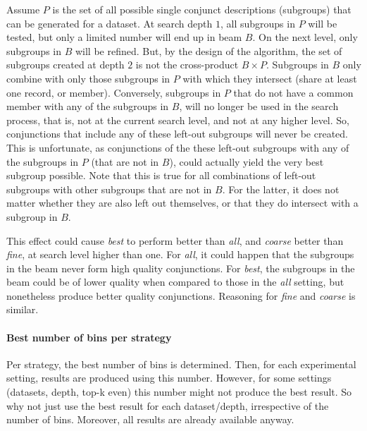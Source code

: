 \documentclass[smallextended]{svjour3}
\newcommand{\parameter}{\emph}
\newcommand{\fine}{\parameter{fine}}
\newcommand{\coarse}{\parameter{coarse}}
\newcommand{\all}{\parameter{all}}
\newcommand{\best}{\parameter{best}}
\begin{document}
Assume $P$ is the set of all possible single conjunct descriptions (subgroups) that can be generated for a dataset.
At search depth $1$, all subgroups in $P$ will be tested, but only a limited number will end up in beam $B$.
On the next level, only subgroups in $B$ will be refined.
But, by the design of the algorithm, the set of subgroups created at depth $2$ is not the cross-product $B \times P$.
Subgroups in $B$ only combine with only those subgroups in $P$ with which they intersect (share at least one record, or member).
Conversely, subgroups in $P$ that do not have a common member with any of the subgroups in $B$, will no longer be used in the search process, that is, not at the current search level, and not at any higher level.
So, conjunctions that include any of these left-out subgroups will never be created.
This is unfortunate, as conjunctions of the these left-out subgroups with any of the subgroups in $P$ (that are not in $B$), could actually yield the very best subgroup possible.
Note that this is true for all combinations of left-out subgroups with other subgroups that are not in $B$.
For the latter, it does not matter whether they are also left out themselves, or that they do intersect with a subgroup in $B$.

This effect could cause \best{} to perform better than \all{}, and \coarse{} better than \fine{}, at search level higher than one.
For \all{}, it could happen that the subgroups in the beam never form high quality conjunctions.
For \best{}, the subgroups in the beam could be of lower quality when compared to those in the \all{} setting, but nonetheless produce better quality conjunctions.
Reasoning for \fine{} and \coarse{} is similar.

\paragraph{Best number of bins per strategy}
Per strategy, the best number of bins is determined.
Then, for each experimental setting, results are produced using this number.
However, for some settings (datasets, depth, top-k even) this number might not produce the best result.
So why not just use the best result for each dataset/depth, irrespective of the number of bins.
Moreover, all results are already available anyway.

\clearpage
\pagebreak
\end{document}
